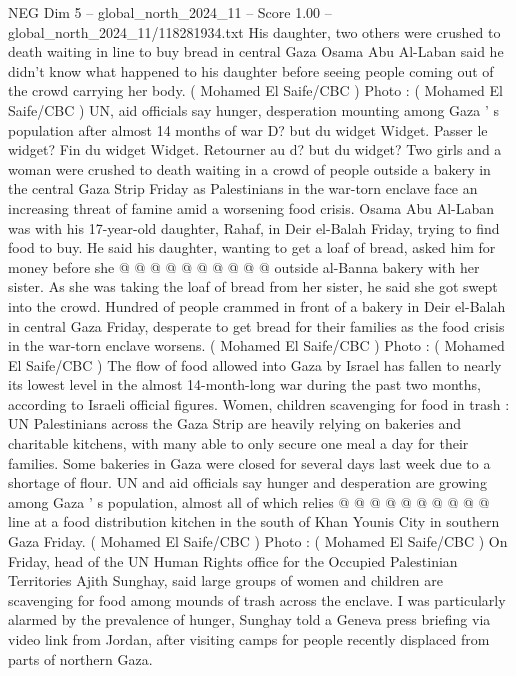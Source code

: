 \begin{textsample}{NEG Dim 5 – global\_north\_2024\_11 – Score 1.00 – global\_north\_2024\_11/118281934.txt}  \label{ex:f5_neg_416}
His daughter, two others were crushed to death waiting in line to buy bread in central Gaza Osama Abu Al-Laban said he didn't know what happened to his daughter before seeing people coming out of the crowd carrying her body. ( Mohamed El Saife/CBC ) Photo : ( Mohamed El Saife/CBC ) UN, aid officials say hunger, desperation mounting among Gaza ' s population after almost 14 months of war D? but du widget Widget.
Passer le widget?
Fin du widget Widget.
Retourner au d? but du widget?
Two girls and a woman were crushed to death waiting in a crowd of people outside a bakery in the central Gaza Strip Friday as Palestinians in the war-torn enclave face an increasing threat of famine amid a worsening food crisis.
Osama Abu Al-Laban was with his 17-year-old daughter, Rahaf, in Deir el-Balah Friday, trying to find food to buy.
He said his daughter, wanting to get a loaf of bread, asked him for money before she @ @ @ @ @ @ @ @ @ @ outside al-Banna bakery with her sister.
As she was taking the loaf of bread from her sister, he said she got swept into the crowd.
Hundred of people crammed in front of a bakery in Deir el-Balah in central Gaza Friday, desperate to get bread for their families as the food crisis in the war-torn enclave worsens. ( Mohamed El Saife/CBC ) Photo : ( Mohamed El Saife/CBC ) The flow of food allowed into Gaza by Israel has fallen to nearly its lowest level in the almost 14-month-long war during the past two months, according to Israeli official figures.
Women, children scavenging for food in trash : UN Palestinians across the Gaza Strip are heavily relying on bakeries and charitable kitchens, with many able to only secure one meal a day for their families.
Some bakeries in Gaza were closed for several days last week due to a shortage of flour.
UN and aid officials say hunger and desperation are growing among Gaza ' s population, almost all of which relies @ @ @ @ @ @ @ @ @ @ line at a food distribution kitchen in the south of Khan Younis City in southern Gaza Friday. ( Mohamed El Saife/CBC ) Photo : ( Mohamed El Saife/CBC ) On Friday, head of the UN Human Rights office for the Occupied Palestinian Territories Ajith Sunghay, said large groups of women and children are scavenging for food among mounds of trash across the enclave.
I was particularly alarmed by the prevalence of hunger, Sunghay told a Geneva press briefing via video link from Jordan, after visiting camps for people recently displaced from parts of northern Gaza.

\end{textsample}
